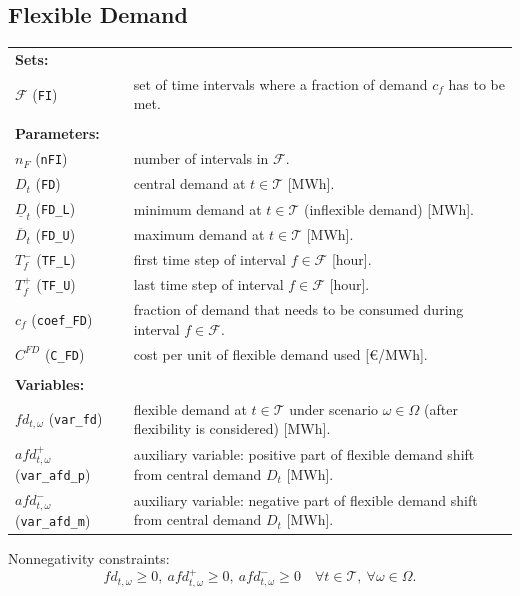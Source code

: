 \subsection{Flexible Demand}
\label{SEC:FlexibleDemand1}

\begin{tabularx}{\textwidth}{l X}
\textbf{Sets:} \\
$\mathcal{F}$ (\texttt{FI}) & set of time intervals where a fraction of demand $c_f$ has to be met. \\
\\

\textbf{Parameters:} \\
$n_F$ (\texttt{nFI}) & number of intervals in $\mathcal{F}$. \\
$D_t$ (\texttt{FD}) & central demand at $t \in \mathcal{T}$ [MWh]. \\
$\underline{D}_t$ (\texttt{FD\_L}) & minimum demand at $t \in \mathcal{T}$ (inflexible demand) [MWh]. \\
$\overline{D}_t$ (\texttt{FD\_U}) & maximum demand at $t \in \mathcal{T}$ [MWh]. \\
$T_f^-$ (\texttt{TF\_L}) & first time step of interval $f \in \mathcal{F}$ [hour]. \\
$T_f^+$ (\texttt{TF\_U}) & last time step of interval $f \in \mathcal{F}$ [hour]. \\
$c_f$ (\texttt{coef\_FD}) & fraction of demand that needs to be consumed during interval $f \in \mathcal{F}$. \\
$C^{FD}$ (\texttt{C\_FD}) & cost per unit of flexible demand used [\euro/MWh]. \\
\\

\textbf{Variables:} \\
$fd_{t,\omega}$ (\texttt{var\_fd}) & flexible demand at $t \in \mathcal{T}$ under scenario $\omega \in \Omega$ (after flexibility is considered) [MWh]. \\
$afd_{t,\omega}^+$ (\texttt{var\_afd\_p}) & auxiliary variable: positive part of flexible demand shift from central demand $D_t$ [MWh]. \\
$afd_{t,\omega}^-$ (\texttt{var\_afd\_m}) & auxiliary variable: negative part of flexible demand shift from central demand $D_t$ [MWh]. \\
\end{tabularx}

Nonnegativity constraints:
\begin{equation} \label{EQ:FlexDemandPos1}
	fd_{t, \omega} \geq 0, \ afd_{t, \omega}^+ \geq 0, \ afd_{t, \omega}^- \geq 0 \quad \forall t \in \mathcal{T}, \ \forall \omega \in \Omega.
\end{equation}

